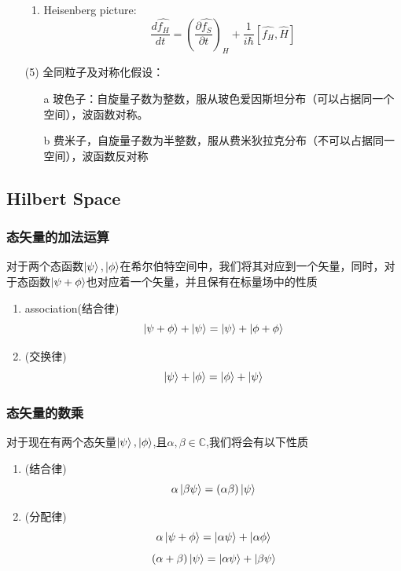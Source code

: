 \documentclass{article}
\begin{document}
\begin{enumerate}
\begin{enumerate}
              \item Heisenberg picture:
                    \begin{equation*}
                        \frac{d\hat{f_H}}{dt} = \left(\frac{\partial\hat{f_S}}{\partial t}\right)_H+\frac{1}{i\hbar}\left[\hat{f_H},\hat{H}\right]
                    \end{equation*}
          \end{enumerate}
    \item[(5)] 全同粒子及对称化假设：
                \begin{enumerate}
                    \item[a] 玻色子：自旋量子数为整数，服从玻色爱因斯坦分布（可以占据同一个空间），波函数对称。
                    \item[b] 费米子，自旋量子数为半整数，服从费米狄拉克分布（不可以占据同一空间），波函数反对称
                \end{enumerate}
\end{enumerate}

\subsection{Hilbert Space}

\subsubsection{态矢量的加法运算}
对于两个态函数$\displaystyle\ket{\psi},\ket{\phi}$在希尔伯特空间中，我们将其对应到一个矢量，同时，对于态函数$\displaystyle\ket{\psi+\phi}$也对应着一个矢量，并且保有在标量场中的性质
\begin{enumerate}
    \item association(结合律) \[\ket{\psi+\phi}+\ket{\psi}=\ket{\psi}+\ket{\phi+\phi}\]
    \item (交换律)\[\ket{\psi}+\ket{\phi}=\ket{\phi}+\ket{\psi}\]
\end{enumerate}

\subsubsection{态矢量的数乘}
对于现在有两个态矢量$\ket{\psi},\ket{\phi}$,且$\alpha,\beta\in\mathbb{C}$,我们将会有以下性质
\begin{enumerate}
    \item (结合律)\[\alpha\ket{\beta\psi}=(\alpha\beta)\ket{\psi}\]
    \item (分配律)\[\alpha\ket{\psi+\phi}=\ket{\alpha\psi}+\ket{\alpha\phi}\]\[(\alpha+\beta)\ket{\psi}=\ket{\alpha\psi}+\ket{\beta\psi}\]
\end{enumerate}
\end{document}
